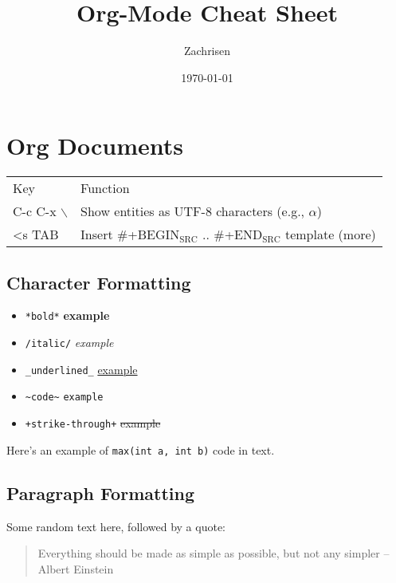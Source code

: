 \documentclass[11pt]{article}
\author{Zachrisen}
\date{\today}
\title{Org-Mode Cheat Sheet}
\begin{document}
\maketitle

\section{Org Documents}
\label{sec-1}

\begin{center}
\begin{tabular}{ll}
Key & Function\\
C-c C-x $\backslash$ & Show entities as UTF-8 characters (e.g., $\alpha$)\\
<s TAB & Insert \#+BEGIN$_{\text{SRC}}$ .. \#+END$_{\text{SRC}}$ template (more)\\
\end{tabular}
\end{center}


\subsection{Character Formatting}
\label{sec-1-1}


\begin{itemize}
\item \texttt{*bold*} \textbf{example}
\item \texttt{/italic/} \emph{example}
\item \texttt{\_underlined\_} \uline{example}
\item \texttt{\textasciitilde{}code\textasciitilde{}} \verb~example~
\item \texttt{+strike-through+} \sout{example}
\end{itemize}

Here's an example of \verb~max(int a, int b)~ code in text.

\subsection{Paragraph Formatting}
\label{sec-1-2}

Some random text here, followed by a quote:

\begin{quote}
Everything should be made as simple as possible,
but not any simpler -- Albert Einstein
\end{quote}
\end{document}
